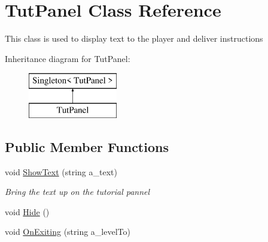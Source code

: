 \hypertarget{class_tut_panel}{}\section{Tut\+Panel Class Reference}
\label{class_tut_panel}


This class is used to display text to the player and deliver instructions  


Inheritance diagram for Tut\+Panel\+:\begin{figure}[H]
\begin{center}
\leavevmode
\includegraphics[height=2.000000cm]{class_tut_panel}
\end{center}
\end{figure}
\subsection*{Public Member Functions}
\begin{DoxyCompactItemize}
\item 
void \mbox{\hyperlink{class_tut_panel_a6df66bbb3483f990b9fc25190d14f31b}{Show\+Text}} (string a\+\_\+text)
\begin{DoxyCompactList}\small\item\em Bring the text up on the tutorial pannel \end{DoxyCompactList}\item 
void \mbox{\hyperlink{class_tut_panel_ac85f2a1d6c69ab03e9d82d8cae6a8a5e}{Hide}} ()
\item 
void \mbox{\hyperlink{class_tut_panel_afc3dfe52f0b733154d4094f78311398b}{On\+Exiting}} (string a\+\_\+level\+To)
\end{DoxyCompactItemize}
